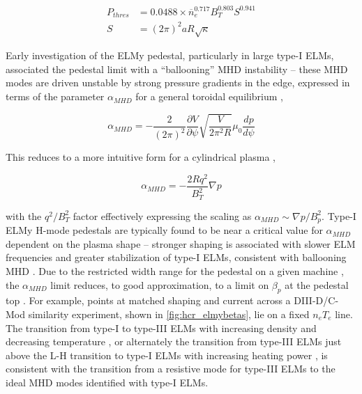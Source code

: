 \begin{equation}\label{eq:pthres}
 \begin{aligned}
  P_{thres} &= 0.0488 \times \overline{n}_e^{0.717} B_T^{0.803} S^{0.941}\\
  S &= (2\pi)^2 aR \sqrt{\kappa}
 \end{aligned}
\end{equation}

Early investigation of the ELMy pedestal, particularly in large type-I ELMs, associated the pedestal limit with a ``ballooning'' MHD instability -- these MHD modes are driven unstable by strong pressure gradients in the edge, expressed in terms of the parameter $\alpha_{MHD}$ for a general toroidal equilibrium \cite{Miller1998},

\begin{equation}\label{eq:alphaMHD}
 \alpha_{MHD} = - \frac{2}{(2\pi)^2} \frac{\partial V}{\partial \psi} \sqrt{\frac{V}{2\pi^2 R}} \mu_0 \frac{dp}{d\psi}
\end{equation}

\noindent This reduces to a more intuitive form for a cylindrical plasma \cite{Connor1978},

\begin{equation}\label{eq:alphaMHD_cyl}
 \alpha_{MHD} = -\frac{2Rq^2}{B_T^2} \nabla p
\end{equation}

\noindent with the $q^2/B_T^2$ factor effectively expressing the scaling as $\alpha_{MHD} \sim \nabla p / B_p^2$.  Type-I ELMy H-mode pedestals are typically found to be near a critical value for $\alpha_{MHD}$ dependent on the plasma shape \cite{Osborne1998} -- stronger shaping is associated with slower ELM frequencies and greater stabilization of type-I ELMs, consistent with ballooning MHD \cite{Zohm1996,Saibene1999,Urano2003}.  Due to the restricted width range for the pedestal on a given machine \cite{Maggi2010,Schneider2013}, the $\alpha_{MHD}$ limit reduces, to good approximation, to a limit on $\beta_{p}$ at the pedestal top \cite{Saibene1999,Urano2003}.  For example, points at matched shaping and current across a DIII-D/C-Mod similarity experiment, shown in \cref{fig:hcr_elmybetas}, lie on a fixed $n_e T_e$ line.  The transition from type-I to type-III ELMs with increasing density and decreasing temperature \cite{Saibene1999}, or alternately the transition from type-III ELMs just above the L-H transition to type-I ELMs with increasing heating power \cite{Connor1998}, is consistent with the transition from a resistive mode for type-III ELMs to the ideal MHD modes identified with type-I ELMs.

